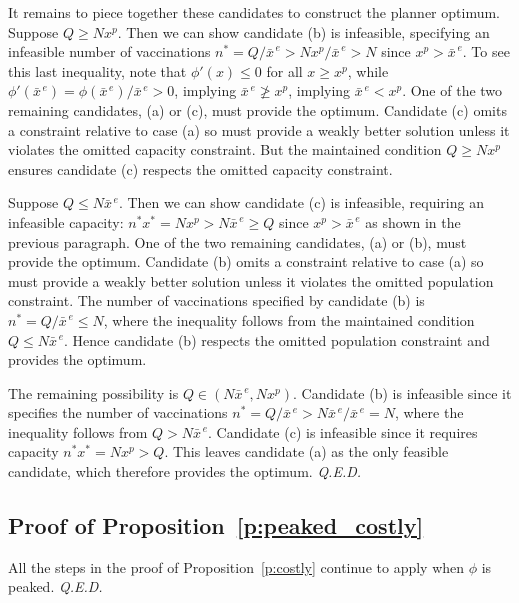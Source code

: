\documentclass[12pt]{article}
\renewcommand{\qed}{{\it Q.E.D.}}
\newcommand{\efficacy}{\phi}
\newcommand{\xunitbar}{\bar{x}^{\,e}}
\newcommand{\xpeak}{x^{p}}
\begin{document}
It remains to piece together these candidates to construct the planner
optimum. Suppose $Q \geq N \xpeak$. Then we can show candidate (b) is
infeasible, specifying an infeasible number of vaccinations $n^* = Q /
\xunitbar > N \xpeak / \xunitbar > N$ since $\xpeak > \xunitbar$. To see this
last inequality, note that $\efficacy'(x) \leq 0$ for all $x \geq
\xpeak$, while $\efficacy'(\xunitbar) = \efficacy(\xunitbar) / \xunitbar > 0$,
implying $\xunitbar \not\geq \xpeak$, implying $\xunitbar < \xpeak$. One of
the two remaining candidates, (a) or (c), must provide the
optimum. Candidate (c) omits a constraint relative to case (a) so must
provide a weakly better solution unless it violates the omitted
capacity constraint. But the maintained condition $Q \geq N \xpeak$
ensures candidate (c) respects the omitted capacity constraint.

Suppose $Q \leq N \xunitbar$. Then we can show candidate (c) is
infeasible, requiring an infeasible capacity: $n^* x^* = N \xpeak > N
\xunitbar \geq Q$ since $\xpeak > \xunitbar$ as shown in the previous
paragraph. One of the two remaining candidates, (a) or (b), must
provide the optimum. Candidate (b) omits a constraint relative to case
(a) so must provide a weakly better solution unless it violates the
omitted population constraint. The number of vaccinations specified by
candidate (b) is $n^* = Q / \xunitbar \leq N$, where the inequality
follows from the maintained condition $Q \leq N \xunitbar$. Hence
candidate (b) respects the omitted population constraint and provides
the optimum.

The remaining possibility is $Q \in (N \xunitbar, N \xpeak)$. Candidate
(b) is infeasible since it specifies the number of vaccinations $n^* =
Q / \xunitbar > N \xunitbar / \xunitbar = N$, where the inequality follows from
$Q > N \xunitbar$. Candidate (c) is infeasible since it requires capacity
$n^* x^* = N \xpeak > Q$. This leaves candidate (a) as the only
feasible candidate, which therefore provides the optimum. \qed


\subsection*{Proof of Proposition~\ref{p:peaked_costly}}

All the steps in the proof of Proposition~\ref{p:costly} continue to apply when $\efficacy$ is peaked. \qed
\end{document}
